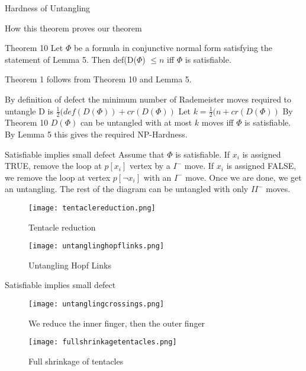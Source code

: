 \documentclass{beamer}
\begin{document}
\begin{section}{Hardness of Untangling}
    \begin{frame}{How this theorem proves our theorem}
        \begin{block}{Theorem 10}
            Let $\Phi$ be a formula in conjunctive normal form satisfying the statement of Lemma 5. Then def(D($\Phi$) $\leq n$ iff $\Phi$ is satisfiable.
        \end{block}{}
        
        Theorem 1 follows from Theorem 10 and Lemma 5.
        
        By definition of defect the minimum number of Rademeister moves required to untangle D is $\frac{1}{2}(def(D(\Phi))+cr(D(\Phi))$
        \newline
        Let $k= \frac{1}{2}(n+cr(D(\Phi))$
        By Theorem 10 $D(\Phi)$ can be untangled with at most $k$ moves iff $\Phi$ is satisfiable. By Lemma 5 this gives the required NP-Hardness.
    \end{frame}{}
    
    \begin{frame}{Satisfiable implies small defect}
        Assume that $\Phi$ is satisfiable. If $x_i$ is assigned TRUE, remove the loop at $p[x_i]$ vertex by a $I^-$ move. If $x_i$ is assigned FALSE, we remove the loop at vertex $p[\neg x_i]$ with an $I^-$ move. Once we are done, we get an untangling. 
        \newline
        \newline
        The rest of the diagram can be untangled with only $II^-$ moves. 
        \begin{figure}
            \texttt{[image: tentaclereduction.png]}
            \caption{Tentacle reduction}
        \end{figure}
        \begin{figure}
            \texttt{[image: untanglinghopflinks.png]}
            \caption{Untangling Hopf Links}
        \end{figure}
    \end{frame}{}
    
    \begin{frame}{Satisfiable implies small defect}
        \begin{figure}
            \texttt{[image: untanglingcrossings.png]}
            \caption{We reduce the inner finger, then the outer finger}
        \end{figure}
        
        \begin{figure}
            \texttt{[image: fullshrinkagetentacles.png]}
            \caption{Full shrinkage of tentacles}
        \end{figure}
    \end{frame}{}
    

\end{section}
\end{document}

